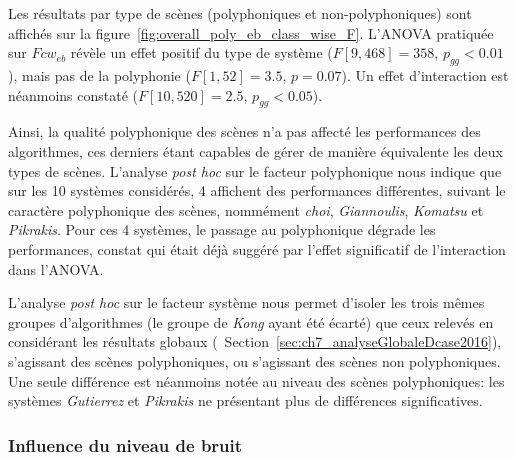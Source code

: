 Les résultats par type de scènes (polyphoniques et non-polyphoniques) sont affichés sur la figure~\ref{fig:overall_poly_eb_class_wise_F}. L'ANOVA pratiquée sur $Fcw_{eb}$ révèle un effet positif du type de système ($F[9,468]=358$, $p_{gg}<0.01$), mais pas de la polyphonie ($F[1,52]=3.5$, $p=0.07$). Un effet d'interaction est néanmoins constaté ($F[10,520]=2.5$, $p_{gg}<0.05$).

Ainsi, la qualité polyphonique des scènes n'a pas affecté les performances des algorithmes, ces derniers étant capables de gérer de manière équivalente les deux types de scènes. L'analyse \emph{post hoc} sur le facteur polyphonique nous indique que sur les 10 systèmes considérés, 4 affichent des performances différentes, suivant le caractère polyphonique des scènes, nommément \emph{choi}, \emph{Giannoulis}, \emph{Komatsu} et \emph{Pikrakis}. Pour ces 4 systèmes, le passage au polyphonique dégrade les performances, constat qui était déjà suggéré par l'effet significatif de l'interaction dans l'ANOVA.

L'analyse \emph{post hoc} sur le facteur système nous permet d'isoler les trois mêmes groupes d'algorithmes (le groupe de \emph{Kong} ayant été écarté) que ceux relevés en considérant les résultats globaux (\cf~Section~\ref{sec:ch7_analyseGlobaleDcase2016}), s'agissant des scènes polyphoniques, ou s'agissant des scènes non polyphoniques. Une seule différence est néanmoins notée au niveau des scènes polyphoniques: les systèmes \emph{Gutierrez} et \emph{Pikrakis} ne présentant plus de différences significatives.

\subsubsection{Influence du niveau de bruit}

